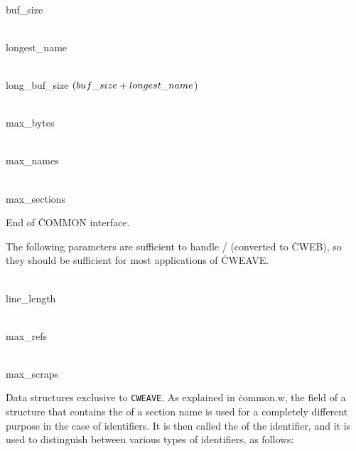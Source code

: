 \Y\B\4\D\\{buf\_size}\5
\par
\B\4\D\\{longest\_name}\5
\par
\B\4\D\\{long\_buf\_size}\5
$(\\{buf\_size}+\\{longest\_name}{}$)\par
\B\4\D\\{max\_bytes}\5
\par
\B\4\D\\{max\_names}\5
\par
\B\4\D\\{max\_sections}\5
\par
\fi

End of \.{COMMON} interface.

\fi

The following parameters are sufficient to handle \TEX/ (converted to
\.{CWEB}), so they should be sufficient for most applications of \.{CWEAVE}.

\Y\B\4\D\\{line\_length}\5
\par
\B\4\D\\{max\_refs}\5
\par
\B\4\D\\{max\_scraps}\5
\par
\fi

Data structures exclusive to {\tt CWEAVE}.
As explained in \.{common.w}, the field of a  structure
that contains the  of a section name is used for a completely
different purpose in the case of identifiers.  It is then called the
 of the identifier, and it is used to
distinguish between various types of identifiers, as follows:

